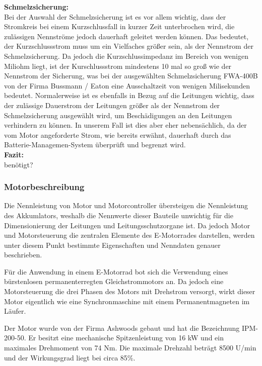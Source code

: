 \textbf{Schmelzsicherung:}
 \\[2mm]
Bei der Auswahl der Schmelzsicherung ist es vor allem wichtig, dass der Stromkreis bei einem Kurzschlussfall in kurzer Zeit unterbrochen wird, die zulässigen Nennströme jedoch dauerhaft geleitet werden können. Das bedeutet, der Kurzschlussstrom muss um ein Vielfaches größer sein, als der Nennstrom der Schmelzsicherung. Da jedoch die Kurzschlussimpedanz im Bereich von wenigen Miliohm liegt, ist der Kurschlussstrom mindestens 10 mal so groß wie der Nennstrom der Sicherung, was bei der ausgewählten Schmelzsicherung \glqq FWA-400B\grqq{} von der Firma \glqq Bussmann / Eaton\grqq{} eine Ausschaltzeit von wenigen Milisekunden bedeutet. Normalerweise ist es ebenfalls in Bezug auf die Leitungen wichtig, dass der zulässige Dauerstrom der Leitungen größer als der Nennstrom der Schmelzsicherung ausgewählt wird, um Beschädigungen an den Leitungen verhindern zu können. In unserem Fall ist dies aber eher nebensächlich, da der vom Motor angeforderte Strom, wie bereits erwähnt, dauerhaft durch das Batterie-Managemen-System überprüft und begrenzt wird.
\\[3mm]

\textbf{Fazit:}
\\[2mm]
benötigt?

\newpage

\subsubsection{Motorbeschreibung}
Die Nennleistung von Motor und Motorcontroller übersteigen die Nennleistung des Akkumlators, weshalb die Nennwerte dieser Bauteile unwichtig für die Dimensionierung der Leitungen und Leitungsschutzorgane ist. Da jedoch Motor und Motorsteuerung die zentralen Elemente des E-Motorrades darstellen, werden unter diesem Punkt bestimmte Eigenschaften und Nenndaten genauer beschrieben.

Für die Anwendung in einem E-Motorrad bot sich die Verwendung eines bürstenlosen  permanenterregten Gleichstrommotors an. Da jedoch eine Motorsteuerung die drei Phasen des Motors mit Drehstrom versorgt, wirkt dieser Motor eigentlich wie eine Synchronmaschine mit einem Permanentmagneten im Läufer. 

Der Motor wurde von der Firma Ashwoods gebaut und hat die Bezeichnung \glqq IPM-200-50\grqq{}. Er besitzt eine mechanische Spitzenleistung von 16 kW und ein maximales Drehmoment von 74 Nm. Die maximale Drehzahl beträgt 8500 U/min und der Wirkungsgrad liegt bei circa 85\%.

